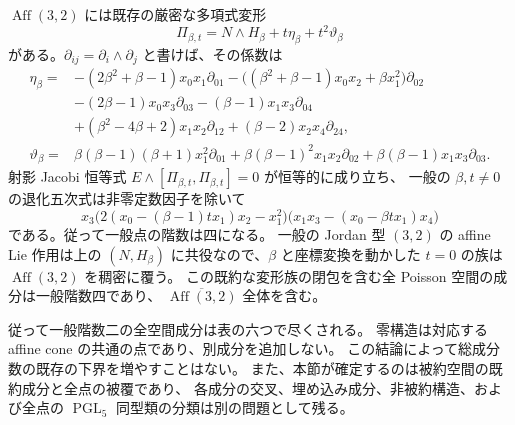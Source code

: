 $\operatorname{Aff}(3,2)$ には既存の厳密な多項式変形
\[
 \Pi_{\beta,t}=N\wedge H_\beta+t\eta_\beta+t^2\vartheta_\beta
\]
がある。$\partial_{ij}=\partial_i\wedge\partial_j$ と書けば、その係数は
\begin{align*}
 \eta_\beta={}&-(2\beta^2+\beta-1)x_0x_1\partial_{01}
 -\bigl((\beta^2+\beta-1)x_0x_2+\beta x_1^2\bigr)\partial_{02}\\
 &-(2\beta-1)x_0x_3\partial_{03}
 -(\beta-1)x_1x_3\partial_{04}\\
 &+(\beta^2-4\beta+2)x_1x_2\partial_{12}
 +(\beta-2)x_2x_4\partial_{24},\\
 \vartheta_\beta={}&\beta(\beta-1)(\beta+1)x_1^2\partial_{01}
 +\beta(\beta-1)^2x_1x_2\partial_{02}
 +\beta(\beta-1)x_1x_3\partial_{03}.
\end{align*}
射影 Jacobi 恒等式 $E\wedge[\Pi_{\beta,t},\Pi_{\beta,t}]=0$ が恒等的に成り立ち、
一般の $\beta,t\ne0$ の退化五次式は非零定数因子を除いて
\[
 x_3\bigl(2(x_0-(\beta-1)t x_1)x_2-x_1^2\bigr)
 \bigl(x_1x_3-(x_0-\beta t x_1)x_4\bigr)
\]
である。従って一般点の階数は四になる。
一般の Jordan 型 $(3,2)$ の affine Lie 作用は上の
$(N,H_\beta)$ に共役なので、$\beta$ と座標変換を動かした $t=0$ の族は
$\operatorname{Aff}(3,2)$ を稠密に覆う。
この既約な変形族の閉包を含む全 Poisson 空間の成分は一般階数四であり、
$\overline{\operatorname{Aff}(3,2)}$ 全体を含む。

従って一般階数二の全空間成分は表の六つで尽くされる。
零構造は対応する affine cone の共通の点であり、別成分を追加しない。
この結論によって総成分数の既存の下界を増やすことはない。
また、本節が確定するのは被約空間の既約成分と全点の被覆であり、
各成分の交叉、埋め込み成分、非被約構造、および全点の
$\operatorname{PGL}_5$ 同型類の分類は別の問題として残る。
